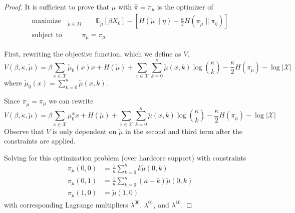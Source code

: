 \documentclass[12pt]{article}
\numberwithin{equation}{section}
\begin{document}
\begin{proof}
    It is sufficient to prove that $\widehat{\mu}$ with $\widehat{\pi} = \pi_\mu$ is the optimizer of
    \begin{equation}
        \begin{aligned}
            \text{maximize}   & _{\tilde{\mu}\in M}\qquad \mathbb{E}_{\tilde{\mu}}\left[\beta X_0\right] - \left[H(\tilde{\mu}\|\eta) - \frac\kappa2 H(\pi_{\tilde{\mu}}\| \pi_\eta)\right] \\
            \text{subject to} & \qquad \pi_{\tilde{\mu}} = \pi_\mu
        \end{aligned}
    \end{equation}

    First, rewriting the objective function, which we define as $V$.
    \begin{equation*}
        V(\beta, \kappa, \tilde{\mu}) = \beta\sum_{x\in\mathcal{X}} \tilde{\mu}_0(x) x + H(\tilde{\mu}) + \sum_{x\in\mathcal{X}}\sum_{k=0}^\kappa \tilde{\mu}(x, k)\log{\kappa\choose k} - \frac\kappa2 H(\pi_{\tilde{\mu}}) - \log|\mathcal{X}|
    \end{equation*}
    where $\tilde{\mu}_0(x) = \sum_{k=0}^\kappa\tilde{\mu}(x, k)$.

    Since $\pi_{\tilde{\mu}} = \pi_\mu$ we can rewrite
    \begin{equation}
        V(\beta, \kappa, \tilde{\mu}) = \beta\sum_{x\in\mathcal{X}} \mu_0^x x + H(\tilde{\mu}) + \sum_{x\in\mathcal{X}}\sum_{k=0}^\kappa \tilde{\mu}(x, k)\log{\kappa\choose k} - \frac\kappa2 H(\pi_{\mu}) - \log|\mathcal{X}|
        \label{Eq.HAIS-V-2}
    \end{equation}
    Observe that $V$ is only dependent on $\tilde{\mu}$ in the second and third term after the constraints are applied.

    Solving for this optimization problem (over hardcore support) with constraints
    \begin{equation}
        \begin{aligned}
            \pi_\mu(0, 0) & = \frac1\kappa \sum_{k=0}^\kappa k\tilde{\mu}(0, k)          \\
            \pi_\mu(0, 1) & = \frac1\kappa \sum_{k=0}^\kappa (\kappa-k)\tilde{\mu}(0, k) \\
            \pi_\mu(1, 0) & = \tilde{\mu}(1, 0)
        \end{aligned}
    \end{equation}
    with corresponding Lagrange multipliers $\lambda^{00}$, $\lambda^{01}$, and $\lambda^{10}$.


\end{proof}
\end{document}
